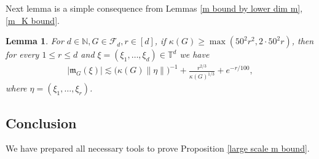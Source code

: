 \documentclass[a4paper,oneside, reqno]{amsart}
\numberwithin{equation}{section}
\newtheorem{Lem}[Thm]{Lemma}
\theoremstyle{definition}%
\theoremstyle{definition}
\theoremstyle{definition}%
\theoremstyle{definition}
\newcommand{\N}{\mathbb{N}}
\newcommand{\T}{\mathbb{T}}
\begin{document}
Next lemma is a simple consequence from Lemmas \ref{m bound by lower dim m}, \ref{m_K bound}.
\begin{Lem}
\label{m bound from m_K bound}
For $d\in\N, G \in \mathcal{F}_d, r \in [d]$, if $\kappa(G)\ge \max(50^2r^2, 2 \cdot 50^2r)$, then for every $1\le r\le d$ and $\xi=(\xi_1,\ldots,\xi_d)\in\T^d$ we have
\begin{align*}
  |\mathfrak m_G(\xi)|\lesssim\big(\kappa(G)\|\eta\|\big)^{-1}+ \frac{r^{2/3}}{\kappa(G)^{1/3}} + e^{-r/100},
\end{align*}
 where $\eta=(\xi_1,\ldots, \xi_r)$.
\end{Lem}

\subsection{Conclusion} We have prepared all necessary tools to
prove Proposition \ref{large scale m bound}.
\end{document}

